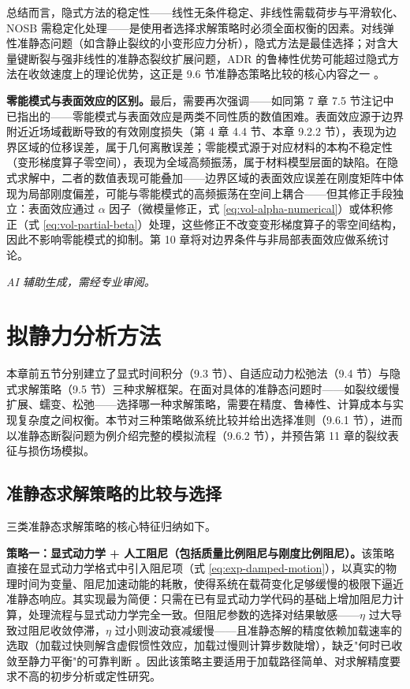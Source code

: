 总结而言，隐式方法的稳定性——线性无条件稳定、非线性需载荷步与平滑软化、NOSB 需稳定化处理——是使用者选择求解策略时必须全面权衡的因素。对线弹性准静态问题（如含静止裂纹的小变形应力分析），隐式方法是最佳选择；对含大量键断裂与强非线性的准静态裂纹扩展问题，ADR 的鲁棒性优势可能超过隐式方法在收敛速度上的理论优势，这正是 9.6 节准静态策略比较的核心内容之一 \cite{Ni2019,Li2019,Hashim2020}。

\textbf{零能模式与表面效应的区别。}最后，需要再次强调——如同第 7 章 7.5 节注记中已指出的——零能模式与表面效应是两类不同性质的数值困难。表面效应源于边界附近近场域截断导致的有效刚度损失（第 4 章 4.4 节、本章 9.2.2 节），表现为边界区域的位移误差，属于几何离散误差；零能模式源于对应材料的本构不稳定性（变形梯度算子零空间），表现为全域高频振荡，属于材料模型层面的缺陷。在隐式求解中，二者的数值表现可能叠加——边界区域的表面效应误差在刚度矩阵中体现为局部刚度偏差，可能与零能模式的高频振荡在空间上耦合——但其修正手段独立：表面效应通过 $\alpha$ 因子（微模量修正，式 \eqref{eq:vol-alpha-numerical}）或体积修正（式 \eqref{eq:vol-partial-beta}）处理，这些修正不改变变形梯度算子的零空间结构，因此不影响零能模式的抑制。第 10 章将对边界条件与非局部表面效应做系统讨论。

\emph{AI 辅助生成，需经专业审阅。}

\section{拟静力分析方法}\label{sec:qs-analysis}

本章前五节分别建立了显式时间积分（9.3 节）、自适应动力松弛法（9.4 节）与隐式求解策略（9.5 节）三种求解框架。在面对具体的准静态问题时——如裂纹缓慢扩展、蠕变、松弛——选择哪一种求解策略，需要在精度、鲁棒性、计算成本与实现复杂度之间权衡。本节对三种策略做系统比较并给出选择准则（9.6.1 节），进而以准静态断裂问题为例介绍完整的模拟流程（9.6.2 节），并预告第 11 章的裂纹表征与损伤场模拟。

\subsection{准静态求解策略的比较与选择}\label{sec:qs-comparison}

三类准静态求解策略的核心特征归纳如下。

\textbf{策略一：显式动力学 + 人工阻尼（包括质量比例阻尼与刚度比例阻尼）。}该策略直接在显式动力学格式中引入阻尼项（式 \eqref{eq:exp-damped-motion}），以真实的物理时间为变量、阻尼加速动能的耗散，使得系统在载荷变化足够缓慢的极限下逼近准静态响应。其实现最为简便：只需在已有显式动力学代码的基础上增加阻尼力计算，处理流程与显式动力学完全一致。但阻尼参数的选择对结果敏感——$\eta$ 过大导致过阻尼收敛停滞，$\eta$ 过小则波动衰减缓慢——且准静态解的精度依赖加载速率的选取（加载过快则解含虚假惯性效应，加载过慢则计算步数陡增），缺乏"何时已收敛至静力平衡"的可靠判断 \cite{MadenciOterkus2014}。因此该策略主要适用于加载路径简单、对求解精度要求不高的初步分析或定性研究。

